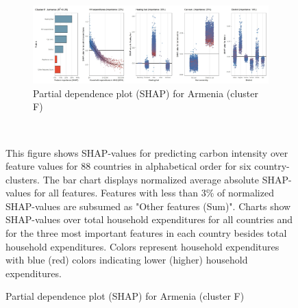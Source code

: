 \begin{figure}[ht!]
    \\
    \vspace{0.5cm}
   \begin{subfigure}[b]{\textwidth}
    \centering
         \caption{Partial dependence plot (SHAP) for Armenia (cluster F)}
         \label{fig:5b_ARM}
         \includegraphics[width=\textwidth]{Figure 5b/Figure_5b_ARM} 
    \end{subfigure}
    \\
    \vspace{0.5cm}
   
    \begin{subcaption2}
     This figure shows SHAP-values for predicting carbon intensity over feature values for 88 countries in alphabetical order for six country-clusters. The bar chart displays normalized average absolute SHAP-values for all features. Features with less than 3\% of normalized SHAP-values are subsumed as "Other features (Sum)". Charts show SHAP-values over total household expenditures for all countries and for the three most important features in each country besides total household expenditures. Colors represent household expenditures with blue (red) colors indicating lower (higher) household expenditures.
     \end{subcaption2}
\end{figure}

\clearpage

